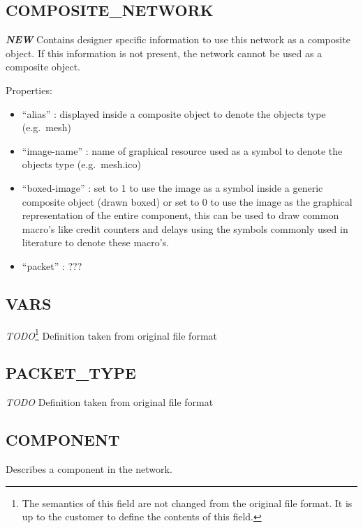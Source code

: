 \subsection{COMPOSITE\_NETWORK}\label{compositeux5fnetwork}

\textbf{\emph{NEW}} Contains designer specific information to use this
network as a composite object. If this information is not present, the
network cannot be used as a composite object.

Properties:

\begin{itemize}
\itemsep1pt\parskip0pt
\item
  ``alias'' : displayed inside a composite object to denote the objects
  type (e.g.~mesh)
\item
  ``image-name'' : name of graphical resource used as a symbol to denote
  the objects type (e.g.~mesh.ico)
\item
  ``boxed-image'' : set to 1 to use the image as a symbol inside a
  generic composite object (drawn boxed) or set to 0 to use the image as
  the graphical representation of the entire component, this can be used
  to draw common macro's like credit counters and delays using the
  symbols commonly used in literature to denote these macro's.
\item
  ``packet'' : ???
\end{itemize}

\subsection{VARS}\label{vars}

\emph{TODO}\footnote{\label{fileformat-todo}The semantics of this field are not changed from the original file format.
It is up to the customer to define the contents of this field.}
Definition taken from original file format

\subsection{PACKET\_TYPE}\label{packetux5ftype}

\emph{TODO}
Definition taken from original file format

\subsection{COMPONENT}\label{component}

Describes a component in the network.

